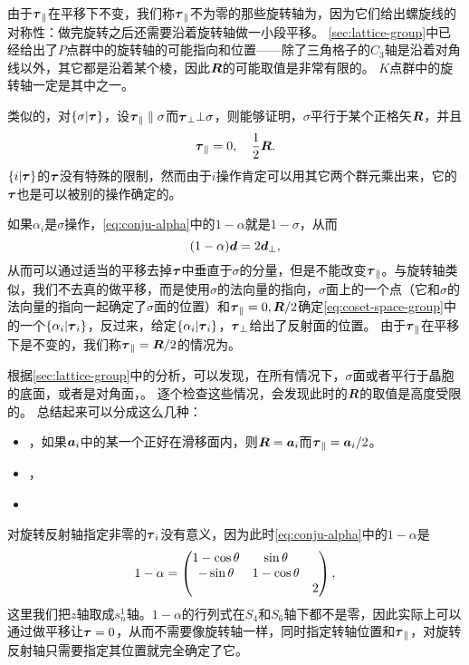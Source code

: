 由于$\vb*{\tau}_\parallel$在平移下不变，我们称$\vb*{\tau}_\parallel$不为零的那些旋转轴为，因为它们给出螺旋线的对称性：做完旋转之后还需要沿着旋转轴做一小段平移。
\autoref{sec:lattice-group}中已经给出了$P$点群中的旋转轴的可能指向和位置——除了三角格子的$C_3$轴是沿着对角线以外，其它都是沿着某个棱，因此$\vb*{R}$的可能取值是非常有限的。
$K$点群中的旋转轴一定是其中之一。

类似的，对$\{\sigma | \vb*{\tau} \}$，设$\vb*{\tau}_\parallel \parallel \sigma$而$\vb*{\tau}_\bot \bot \sigma$，则能够证明，$\sigma$平行于某个正格矢$\vb*{R}$，并且
\begin{equation}
    \vb*{\tau}_\parallel = 0, \quad \frac{1}{2} \vb*{R}.
\end{equation}
$\{i | \vb*{\tau}\}$的$\vb*{\tau}$没有特殊的限制，然而由于$i$操作肯定可以用其它两个群元乘出来，它的$\vb*{\tau}$也是可以被别的操作确定的。

如果$\alpha_i$是$\sigma$操作，\eqref{eq:conju-alpha}中的$1- \alpha$就是$1 - \sigma$，从而
\[
    (1 - \alpha) \vb*{d} = 2 \vb*{d}_\bot,
\]
从而可以通过适当的平移去掉$\vb*{\tau}$中垂直于$\sigma$的分量，但是不能改变$\vb*{\tau}_\parallel$。与旋转轴类似，我们不去真的做平移，而是使用$\sigma$的法向量的指向，$\sigma$面上的一个点（它和$\sigma$的法向量的指向一起确定了$\sigma$面的位置）和$\vb*{\tau}_\parallel = 0, \vb*{R}/2$确定\eqref{eq:coset-space-group}中的一个$\{ \alpha_i | \vb*{\tau}_i \}$，反过来，给定$\{ \alpha_i | \vb*{\tau}_i \}$，$\vb*{\tau}_\bot$给出了反射面的位置。
由于$\vb*{\tau}_\parallel$在平移下是不变的，我们称$\vb*{\tau}_\parallel = \vb*{R} / 2$的情况为。

根据\autoref{sec:lattice-group}中的分析，可以发现，在所有情况下，$\sigma$面或者平行于晶胞的底面，或者是对角面，。
逐个检查这些情况，会发现此时的$\vb*{R}$的取值是高度受限的。
总结起来可以分成这么几种：
\begin{itemize}
    \item {}，如果$\vb*{a}_i$中的某一个正好在滑移面内，则$\vb*{R} = \vb*{a}_i$而$\vb*{\tau}_\parallel = \vb*{a}_i / 2$。
    \item {}，
    \item {} %
\end{itemize}

对旋转反射轴指定非零的$\vb*{\tau}_i$没有意义，因为此时\eqref{eq:conju-alpha}中的$1 - \alpha$是
\[
    1 - \alpha = \pmqty{ \dmat{ 1 - \cos \theta & \sin \theta \\ - \sin \theta & 1 - \cos \theta, 2 } },
\]
这里我们把$z$轴取成$s_n^1$轴。$1 - \alpha$的行列式在$S_4$和$S_6$轴下都不是零，因此实际上可以通过做平移让$\vb*{\tau} = 0$，从而不需要像旋转轴一样，同时指定转轴位置和$\vb*{\tau}_\parallel$，对旋转反射轴只需要指定其位置就完全确定了它。

